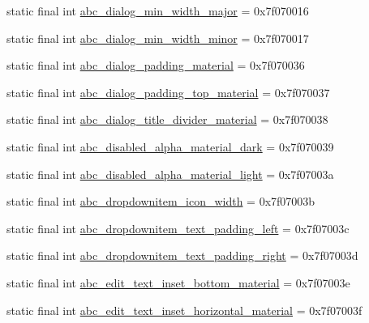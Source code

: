 \begin{CompactItemize}
\item 
static final int \hyperlink{classcom_1_1companyname_1_1x__2doo_1_1_r_1_1dimen_4a22ba5edc2a6be8bf7061103aeef8bb}{abc\_\-dialog\_\-min\_\-width\_\-major} = 0x7f070016
\item 
static final int \hyperlink{classcom_1_1companyname_1_1x__2doo_1_1_r_1_1dimen_0b4bfcc1ecc72c7117d241109aaef4b2}{abc\_\-dialog\_\-min\_\-width\_\-minor} = 0x7f070017
\item 
static final int \hyperlink{classcom_1_1companyname_1_1x__2doo_1_1_r_1_1dimen_d8219065f8d99c030932ee4eac5f7c60}{abc\_\-dialog\_\-padding\_\-material} = 0x7f070036
\item 
static final int \hyperlink{classcom_1_1companyname_1_1x__2doo_1_1_r_1_1dimen_25a5514fe8241153f69f784e7d69d432}{abc\_\-dialog\_\-padding\_\-top\_\-material} = 0x7f070037
\item 
static final int \hyperlink{classcom_1_1companyname_1_1x__2doo_1_1_r_1_1dimen_0cc3c2cf46862f596010f04a71935c35}{abc\_\-dialog\_\-title\_\-divider\_\-material} = 0x7f070038
\item 
static final int \hyperlink{classcom_1_1companyname_1_1x__2doo_1_1_r_1_1dimen_1dfbc58349318b06b79adc3b19639dd6}{abc\_\-disabled\_\-alpha\_\-material\_\-dark} = 0x7f070039
\item 
static final int \hyperlink{classcom_1_1companyname_1_1x__2doo_1_1_r_1_1dimen_b377d04f651ed1486fe80f81498f5311}{abc\_\-disabled\_\-alpha\_\-material\_\-light} = 0x7f07003a
\item 
static final int \hyperlink{classcom_1_1companyname_1_1x__2doo_1_1_r_1_1dimen_2026638d8f1b2ee06bb447d7299ff1bb}{abc\_\-dropdownitem\_\-icon\_\-width} = 0x7f07003b
\item 
static final int \hyperlink{classcom_1_1companyname_1_1x__2doo_1_1_r_1_1dimen_9e6445fb8bd74ff996bbe366fa66dd58}{abc\_\-dropdownitem\_\-text\_\-padding\_\-left} = 0x7f07003c
\item 
static final int \hyperlink{classcom_1_1companyname_1_1x__2doo_1_1_r_1_1dimen_e88996384109766a1bf1f524fc0ef036}{abc\_\-dropdownitem\_\-text\_\-padding\_\-right} = 0x7f07003d
\item 
static final int \hyperlink{classcom_1_1companyname_1_1x__2doo_1_1_r_1_1dimen_1de702223f3720f54367dc15fa11083c}{abc\_\-edit\_\-text\_\-inset\_\-bottom\_\-material} = 0x7f07003e
\item 
static final int \hyperlink{classcom_1_1companyname_1_1x__2doo_1_1_r_1_1dimen_4153c30434e8f9370ac7a4af32b69417}{abc\_\-edit\_\-text\_\-inset\_\-horizontal\_\-material} = 0x7f07003f

\end{CompactItemize}
